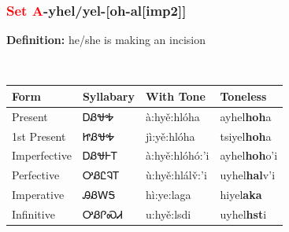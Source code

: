 \subsubsection*{\textcolor{Red}{Set A}{-}\textbf{yhel/yel}{-}[oh-al[imp2]]}
\nopagebreak
\textbf{Definition: } he/she is making an incision
\\[0.5em]
\begin{tabularx}{\textwidth}{l X X X}%
\toprule%
\textbf{Form}&\textbf{Syllabary}&\textbf{With Tone}&\textbf{Toneless}\\%
\midrule%
Present&ᎠᏰᏠᎭ&à:hyě:hlóha&ayhel\textbf{hoh}a\\%
1st Present&ᏥᏰᏠᎭ&jì:yě:hlóha&tsiyel\textbf{hoh}a\\%
Imperfective&ᎠᏰᏠᎰᎢ&à:hyě:hlóhó:’i&ayhel\textbf{hoh}o'i\\%
Perfective&ᎤᏰᏝᎸᎢ&ù:hyě:hlálv̌:’i&uyhel\textbf{hal}v'i\\%
Imperative&ᎯᏰᎳᎦ&hì:ye:laga&hiyel\textbf{aka}\\%
Infinitive&ᎤᏰᎵᏍᏗ&u:hyě:lsdi&uyhel\textbf{hst}i\\%
\bottomrule%
\end{tabularx}
\\[1em]